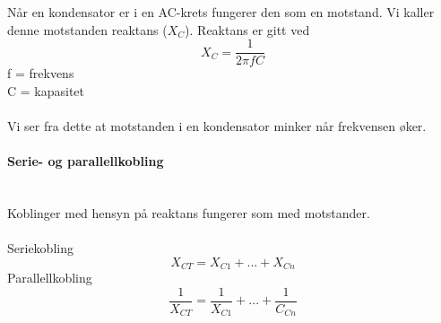 Når en kondensator er i en AC-krets fungerer den som en motstand.
Vi kaller denne motstanden reaktans ($X_C$).
Reaktans er gitt ved
$$X_C = \frac{1}{2 \pi f C}$$
f = frekvens \\
C = kapasitet
\\\\
Vi ser fra dette at motstanden i en kondensator
minker når frekvensen øker.



\paragraph{Serie- og parallellkobling} \mbox{} \\
Koblinger med hensyn på reaktans fungerer som med motstander.
\\\\
Seriekobling
$$X_{CT} = X_{C1} + ... + X_{Cn}$$
Parallellkobling
$$\frac{1}{X_{CT}} = \frac{1}{X_{C1}} + ... + \frac{1}{C_{Cn}}$$
